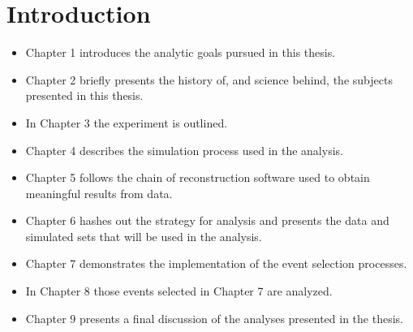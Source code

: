 \chapter{Introduction}
\label{intro_chapter}

\begin{itemize}

\item Chapter 1 introduces the analytic goals pursued in this thesis.

\item Chapter 2 briefly presents the history of, and science behind, the
subjects presented in this thesis.

\item In Chapter 3 the experiment is outlined.

\item Chapter 4 describes the simulation process used in the analysis.

\item Chapter 5 follows the chain of reconstruction software used to obtain
meaningful results from data.

\item Chapter 6 hashes out the strategy for analysis and presents the data and
simulated sets that will be used in the analysis.

\item Chapter 7 demonstrates the implementation of the event selection
processes.

\item In Chapter 8 those events selected in Chapter 7 are analyzed.

\item Chapter 9 presents a final discussion of the analyses presented in the
thesis.

\end{itemize}

